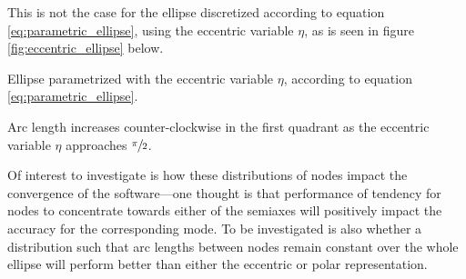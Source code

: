 This is not the case for the ellipse discretized according to equation \eqref{eq:parametric_ellipse}, using the eccentric variable $\eta$, as is seen in figure \ref{fig:eccentric_ellipse} below.
\begin{Figure}
  \centering
  \scalebox{1}{%
    
  }
  \captionsetup{type = figure}
  \caption{Ellipse parametrized with the eccentric variable $\eta$, according to equation \eqref{eq:parametric_ellipse}.}
  \label{fig:eccentric_ellipse}
\end{Figure}
\begin{Figure}
  \centering
  \scalebox{1}{%
    
  }
  \captionsetup{type = figure}
  \caption{Arc length increases counter-clockwise in the first quadrant as the eccentric variable $\eta$ approaches $\sfrac{\pi}{2}$.}
\end{Figure}
Of interest to investigate is how these distributions of nodes impact the convergence of the software---one thought is that performance of tendency for nodes to concentrate towards either of the semiaxes will positively impact the accuracy for the corresponding mode.
To be investigated is also whether a distribution such that arc lengths between nodes remain constant over the whole ellipse will perform better than either the eccentric or polar representation.
